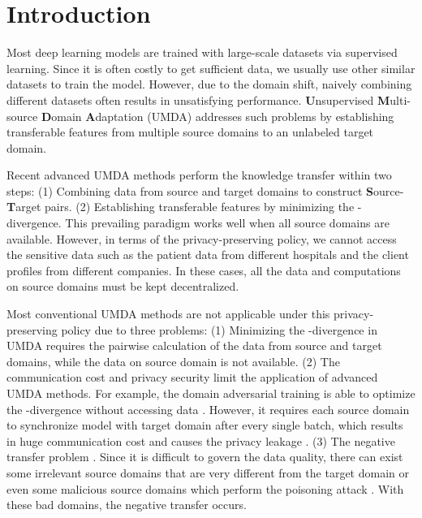 \documentclass{article}
\begin{document}
\section{Introduction}\label{sec:introduction}
Most deep learning models are trained with large-scale datasets via supervised learning. Since it is often costly to get sufficient data, we usually use other similar datasets to train the model. However, due to the domain shift, naively combining different datasets often results in unsatisfying performance. \textbf{U}nsupervised \textbf{M}ulti-source \textbf{D}omain \textbf{A}daptation (UMDA) \citep{DBLP:conf/aaai/ZhangGS15} addresses such problems by establishing transferable features from multiple source domains to an unlabeled target domain.

Recent advanced UMDA methods \cite{DBLP:conf/cvpr/ChangYSKH19,DBLP:conf/aaai/ZhaoWZGLS0HCK20} perform the knowledge transfer within two steps: (1) Combining data from source and target domains to construct \textbf{S}ource-\textbf{T}arget pairs. (2) Establishing transferable features by minimizing the -divergence. This prevailing paradigm works well when all source domains are available. However, in terms of the privacy-preserving policy, we cannot access the sensitive data such as the patient data from different hospitals and the client profiles from different companies. In these cases, all the data and computations on source domains must be kept decentralized.

Most conventional UMDA methods are not applicable under this privacy-preserving policy due to three problems: (1) Minimizing the -divergence in UMDA requires the pairwise calculation of the data from source and target domains, while the data on source domain is not available. (2) The communication cost and privacy security limit the application of advanced UMDA methods. For example, the domain adversarial training is able to optimize the -divergence without accessing data \citep{DBLP:conf/iclr/PengHZS20}. However, it requires each source domain to synchronize model with target domain after every single batch, which results in huge communication cost and causes the privacy leakage \citep{DBLP:conf/nips/ZhuLH19}. (3) The negative transfer problem \citep{5288526}. Since it is difficult to govern the data quality, there can exist some irrelevant source domains that are very different from the target domain or even some malicious source domains which perform the poisoning attack \cite{DBLP:conf/aistats/BagdasaryanVHES20}. With these bad domains, the negative transfer occurs.
\end{document}
